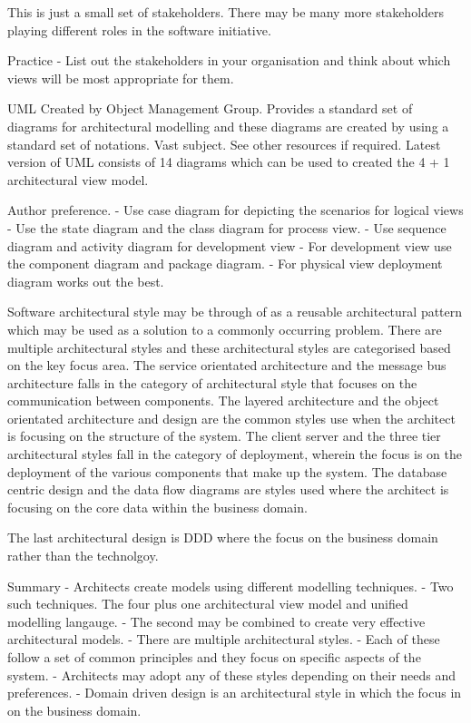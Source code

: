 \documentclass[a4paper, 11pt]{book}
\begin{document}
    This is just a small set of stakeholders.
    There may be many more stakeholders playing different roles in the software initiative.

    Practice
    - List out the stakeholders in your organisation and think about which views will be most appropriate for them.


    UML
    Created by Object Management Group.
    Provides a standard set of diagrams for architectural modelling and these diagrams are created by using a standard set of notations.
    Vast subject.
    See other resources if required.
    Latest version of UML consists of 14 diagrams which can be used to created the 4 + 1 architectural view model.

    Author preference.
    - Use case diagram for depicting the scenarios for logical views
    - Use the state diagram and the class diagram for process view.
    - Use sequence diagram and activity diagram for development view
    - For development view use the component diagram and package diagram.
    - For physical view deployment diagram works out the best.

    Software architectural style may be through of as a reusable architectural pattern which may be used as a solution to a commonly occurring problem.
    There are multiple architectural styles and these architectural styles are categorised based on the key focus area.
    The service orientated architecture and the message bus architecture falls in the category of architectural style that focuses on the communication between components.
    The layered architecture and the object orientated architecture and design are the common styles use when the architect is focusing on the structure of the system.
    The client server and the three tier architectural styles fall in the category of deployment, wherein the focus is on the deployment of the various components that make up the system.
    The database centric design and the data flow diagrams are styles used where the architect is focusing on the core data within the business domain.


    The last architectural design is DDD where the focus on the business domain rather than the technolgoy.

    Summary
    - Architects create models using different modelling techniques.
    - Two such techniques.
    The four plus one architectural view model and unified modelling langauge.
    - The second may be combined to create very effective architectural models.
    - There are multiple architectural styles.
    - Each of these follow a set of common principles and they focus on specific aspects of the system.
    - Architects may adopt any of these styles depending on their needs and preferences.
    - Domain driven design is an architectural style in which the focus in on the business domain.
\end{document}
